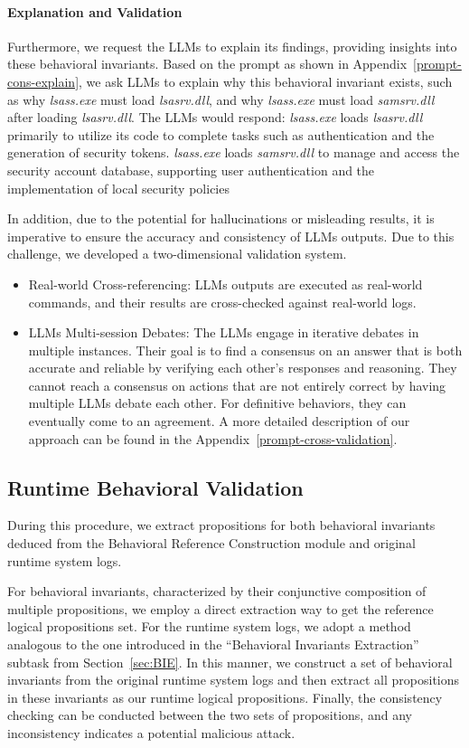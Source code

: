 \paragraph{Explanation and Validation}
Furthermore, we request the LLMs to explain its findings, providing insights into these behavioral invariants.
Based on the prompt as shown in Appendix~\ref{prompt-cons-explain}, we ask LLMs to explain why this behavioral invariant exists, such as why \textit{lsass.exe} must load \textit{lsasrv.dll}, and why \textit{lsass.exe} must load \textit{samsrv.dll} after loading \textit{lsasrv.dll}. 
The LLMs would respond: \textit{lsass.exe} loads \textit{lsasrv.dll} primarily to utilize its code to complete tasks such as authentication and the generation of security tokens. 
\textit{lsass.exe} loads \textit{samsrv.dll} to manage and access the security account database, supporting user authentication and the implementation of local security policies

In addition, due to the potential for hallucinations or misleading results, it is imperative to ensure the accuracy and consistency of LLMs outputs. Due to this challenge, we developed a two-dimensional validation system.
\begin{itemize}
    \item Real-world Cross-referencing: LLMs outputs are executed as real-world commands, and their results are cross-checked against real-world logs.
    \item LLMs Multi-session Debates: The LLMs engage in iterative debates in multiple instances. Their goal is to find a consensus on an answer that is both accurate and reliable by verifying each other's responses and reasoning. They cannot reach a consensus on actions that are not entirely correct by having multiple LLMs debate each other. For definitive behaviors, they can eventually come to an agreement. A more detailed description of our approach can be found in the Appendix~\ref{prompt-cross-validation}.
\end{itemize}

\subsection{Runtime Behavioral Validation}
During this procedure, we extract propositions for both behavioral invariants deduced from the Behavioral Reference Construction module and original runtime system logs.

For behavioral invariants, characterized by their conjunctive composition of multiple propositions, we employ a direct extraction way to get the reference logical propositions set. For the runtime system logs, we adopt a method analogous to the one introduced in the ``Behavioral Invariants Extraction'' subtask from Section~\ref{sec:BIE}. In this manner, we construct a set of behavioral invariants from the original runtime system logs and then extract all propositions in these invariants as our runtime logical propositions. Finally, the consistency checking can be conducted between the two sets of propositions, and any inconsistency indicates a potential malicious attack.


